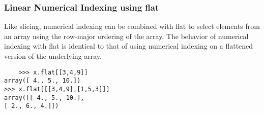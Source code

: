 \documentclass[KSmain.tex]{subfiles}
\begin{document}
\subsubsection*{Linear Numerical Indexing using flat}
Like slicing, numerical indexing can be combined with flat to select elements from an array using the
row-major ordering of the array. The behavior of numerical indexing with flat is identical to that of using
numerical indexing on a flattened version of the underlying array.
\begin{framed}
	\begin{verbatim}
	>>> x.flat[[3,4,9]]
array([ 4., 5., 10.])
>>> x.flat[[[3,4,9],[1,5,3]]]
array([[ 4., 5., 10.],
[ 2., 6., 4.]])
	\end{verbatim}
\end{framed}

\newpage
\end{document}
